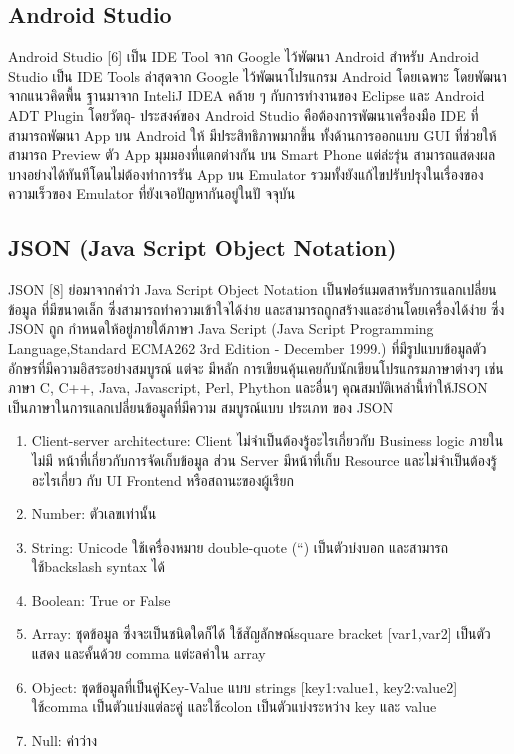 \subsection{Android Studio}
Android Studio [6] เป็น IDE Tool จาก Google ไว้พัฒนา Android สําหรับ Android Studio
เป็น IDE Tools ล่าสุดจาก Google ไว้พัฒนาโปรแกรม Android โดยเฉพาะ โดยพัฒนาจากแนวคิดพื้น
ฐานมาจาก InteliJ IDEA คล้าย ๆ กับการทํางานของ Eclipse และ Android ADT Plugin โดยวัตถุ-
ประสงค์ของ Android Studio คือต้องการพัฒนาเครื่องมือ IDE ที่สามารถพัฒนา App บน Android ให้
มีประสิทธิภาพมากขึ้น ทั้งด้านการออกแบบ GUI ที่ช่วยให้สามารถ Preview ตัว App มุมมองที่แตกต่างกัน
บน Smart Phone แต่ล่ะรุ่น สามารถแสดงผลบางอย่างได้ทันทีโดนไม่ต้องทําการรัน App บน Emulator
รวมทั้งยังแก้ไขปรับปรุงในเรื่องของความเร็วของ Emulator ที่ยังเจอปัญหากันอยู่ในปั จจุบัน

\subsection{JSON (Java Script Object Notation)}
JSON [8] ย่อมาจากคําว่า Java Script Object Notation เป็นฟอร์แมตสาหรับการแลกเปลี่ยนข้อมูล
ที่มีขนาดเล็ก ซึ่งสามารถทําความเข้าใจได้ง่าย และสามารถถูกสร้างและอ่านโดยเครื่องได้ง่าย ซึ่ง JSON ถูก
กําหนดให้อยู่ภายใต้ภาษา Java Script (Java Script Programming Language,Standard ECMA262
3rd Edition - December 1999.) ที่มีรูปแบบข้อมูลตัวอักษรที่มีความอิสระอย่างสมบูรณ์ แต่จะ มีหลัก
การเขียนคุ้นเคยกับนักเขียนโปรแกรมภาษาต่างๆ เช่น ภาษา C, C++, Java, Javascript, Perl, Phython
และอื่นๆ คุณสมบัติเหล่านี้ทําให้JSON เป็นภาษาในการแลกเปลี่ยนข้อมูลที่มีความ สมบูรณ์แบบ ประเภท
ของ JSON
\begin{enumerate}
  \item  Client-server architecture: Client ไม่จําเป็นต้องรู้อะไรเกี่ยวกับ Business logic ภายใน ไม่มี
  หน้าที่เกี่ยวกับการจัดเก็บข้อมูล ส่วน Server มีหน้าที่เก็บ Resource และไม่จําเป็นต้องรู้อะไรเกี่ยว
  กับ UI Frontend หรือสถานะของผู้เรียก
  

  \item  Number: ตัวเลขเท่านั้น
  
  \item String: Unicode ใช้เครื่องหมาย double-quote (“) เป็นตัวบ่งบอก และสามารถใช้backslash
  syntax ได้
  
  \item Boolean: True or False
  \item    Array: ชุดข้อมูล ซึ่งจะเป็นชนิดใดก็ได้ ใช้สัญลักษณ์square bracket [var1,var2] เป็นตัวแสดง
  และคั้นด้วย comma แต่ะลค่าใน array
  \item  Object: ชุดข้อมูลที่เป็นคู่Key-Value แบบ strings [key1:value1, key2:value2] ใช้comma
  เป็นตัวแบ่งแต่ละคู่ และใช้colon เป็นตัวแบ่งระหว่าง key และ value
  \item    Null: ค่าว่าง
\end{enumerate}

